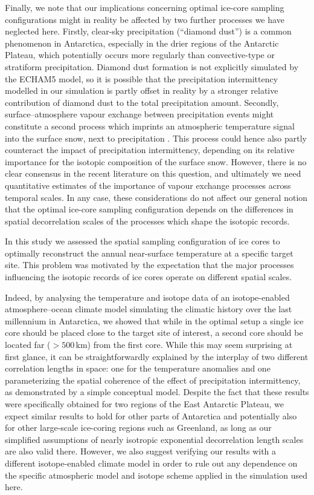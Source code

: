 \documentclass[cp]{copernicus}
\begin{document}
Finally, we note that our implications concerning optimal ice-core sampling
configurations might in reality be affected by two further processes we have
neglected here. Firstly, clear-sky precipitation (``diamond dust'') is a common
phenomenon in Antarctica, especially in the drier regions of the Antarctic
Plateau, which potentially occurs more regularly than convective-type or
stratiform precipitation. Diamond dust formation is not explicitly simulated by
the ECHAM5 model, so it is possible that the precipitation intermittency
modelled in our simulation is partly offset in reality by a stronger relative
contribution of diamond dust to the total precipitation amount. Secondly,
surface--atmosphere vapour exchange between precipitation events might
constitute a second process which imprints an atmospheric temperature signal
into the surface snow, next to precipitation
\citep[e.g.][]{Steen-Larsen2014,Madsen2019}. This process could hence also
partly counteract the impact of precipitation intermittency, depending on its
relative importance for the isotopic composition of the surface snow. However,
there is no clear consensus in the recent literature on this question, and
ultimately we need quantitative estimates of the importance of vapour exchange
processes across temporal scales. In any case, these considerations do not
affect our general notion that the optimal ice-core sampling configuration
depends on the differences in spatial decorrelation scales of the processes
which shape the isotopic records.

\conclusions

In this study we assessed the spatial sampling configuration of ice cores to
optimally reconstruct the annual near-surface temperature at a specific target
site. This problem was motivated by the expectation that the major processes
influencing the isotopic records of ice cores operate on different spatial
scales.

Indeed, by analysing the temperature and isotope data of an isotope-enabled
atmosphere--ocean climate model simulating the climatic history over the last
millennium in Antarctica, we showed that while in the optimal setup a single ice
core should be placed close to the target site of interest, a second core should
be located far ($>500$\,km) from the first core. While this may seem surprising
at first glance, it can be straightforwardly explained by the interplay of two
different correlation lengths in space: one for the temperature anomalies and
one parameterizing the spatial coherence of the effect of precipitation
intermittency, as demonstrated by a simple conceptual model. Despite the fact
that these results were specifically obtained for two regions of the East
Antarctic Plateau, we expect similar results to hold for other parts of
Antarctica and potentially also for other large-scale ice-coring regions such as
Greenland, as long as our simplified assumptions of nearly isotropic exponential
decorrelation length scales are also valid there. However, we also suggest
verifying our results with a different isotope-enabled climate model in order to
rule out any dependence on the specific atmospheric model and isotope scheme
applied in the simulation used here.
\end{document}

